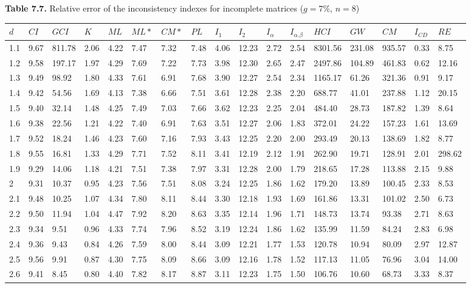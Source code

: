 \newpage
\textbf{Table 7.7.} Relative error of the inconsistency indexes for incomplete matrices ($g=7\%$, $n=8$)
\begin{adjustbox}{angle=90}
  \begin{center}
    \begin{tabular}{|l|llllllllllllllll|}
      \hline $d$ &
$CI$&$GCI$&$K$&$ML$&$ML*$&$CM*$&$PL$&$I_1$&$I_2$&$I_{\alpha}$&$I_{\alpha.\beta}$&$HCI$&$GW$&$CM$&$I_{CD}$&$RE$\\ \hline \hline
1.1&9.67&811.78&2.06&4.22&7.47&7.32&7.48&4.06&12.23&2.72&2.54&8301.56&231.08&935.57&0.33&8.75  \\ 
1.2&9.58&197.17&1.97&4.29&7.69&7.22&7.73&3.98&12.30&2.65&2.47&2497.86&104.89&461.83&0.62&12.16  \\ 
1.3&9.49&98.92&1.80&4.33&7.61&6.91&7.68&3.90&12.27&2.54&2.34&1165.17&61.26&321.36&0.91&9.17  \\ 
1.4&9.42&54.56&1.69&4.13&7.38&6.66&7.51&3.61&12.28&2.38&2.20&688.77&41.01&237.88&1.12&20.15  \\ 
1.5&9.40&32.14&1.48&4.25&7.49&7.03&7.66&3.62&12.23&2.25&2.04&484.40&28.73&187.82&1.39&8.64  \\ 
1.6&9.38&22.56&1.21&4.22&7.40&6.91&7.63&3.51&12.27&2.06&1.83&372.01&24.22&157.23&1.61&13.69  \\ 
1.7&9.52&18.24&1.46&4.23&7.60&7.16&7.93&3.43&12.25&2.20&2.00&293.49&20.13&138.69&1.82&8.77  \\ 
1.8&9.55&16.81&1.33&4.29&7.71&7.52&8.11&3.41&12.19&2.12&1.91&262.90&19.71&128.91&2.01&298.62  \\ 
1.9&9.29&14.06&1.18&4.21&7.51&7.38&7.97&3.31&12.28&2.00&1.79&218.65&17.28&113.88&2.15&9.88  \\ 
2&9.31&10.37&0.95&4.23&7.56&7.51&8.08&3.24&12.25&1.86&1.62&179.20&13.89&100.45&2.33&8.53  \\ 
2.1&9.48&10.25&1.07&4.34&7.80&8.11&8.44&3.30&12.18&1.93&1.69&161.86&13.31&101.02&2.50&6.73  \\ 
2.2&9.50&11.94&1.04&4.47&7.92&8.20&8.63&3.35&12.14&1.96&1.71&148.73&13.74&93.38&2.71&8.63  \\ 
2.3&9.34&9.51&0.96&4.33&7.74&7.96&8.52&3.19&12.24&1.86&1.62&135.99&11.59&84.24&2.83&6.98  \\ 
2.4&9.36&9.43&0.84&4.26&7.59&8.00&8.44&3.09&12.21&1.77&1.53&120.78&10.94&80.09&2.97&12.87  \\ 
2.5&9.56&9.91&0.87&4.30&7.75&8.09&8.66&3.09&12.16&1.78&1.52&117.13&11.05&76.96&3.04&14.00  \\ 
2.6&9.41&8.45&0.80&4.40&7.82&8.17&8.87&3.11&12.23&1.75&1.50&106.76&10.60&68.73&3.33&8.37  \\ 

\end{tabular}
\end{center}
\end{adjustbox}
